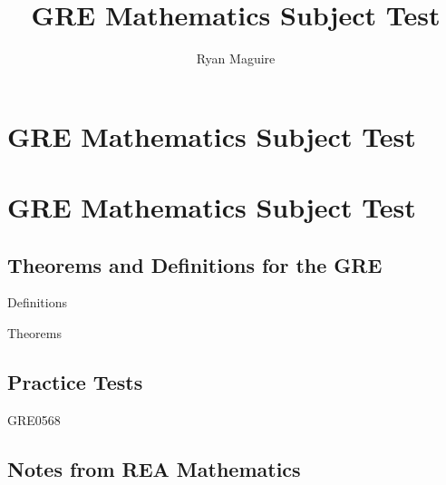 \documentclass[crop=false,class=book,oneside]{standalone}
\begin{document}
    \newif\ifcoursesmathgre
    \ifx\ifmathcourses\undefined
        \title{GRE Mathematics Subject Test}
        \author{Ryan Maguire}
        \date{\vspace{-5ex}}
        \maketitle
        \tableofcontents
        \clearpage
        \chapter*{GRE Mathematics Subject Test}
        \setcounter{chapter}{1}
    \else
        \chapter{GRE Mathematics Subject Test}
    \fi
    \section{Theorems and Definitions for the GRE}
        
                  {Definitions}
        
                  {Theorems}
    \section{Practice Tests}
        {GRE0568}
    \section{Notes from REA Mathematics}
\end{document}
